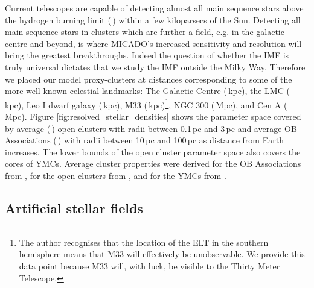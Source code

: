 Current telescopes are capable of detecting almost all main sequence stars above the hydrogen burning limit (\,\msune) within a few kiloparsecs of the Sun. Detecting all main sequence stars in clusters which are further a field, e.g. in the galactic centre and beyond, is where MICADO's increased sensitivity and resolution will bring the greatest breakthroughs. Indeed the question of whether the IMF is truly universal dictates that we study the IMF outside the Milky Way. Therefore we placed our model proxy-clusters at distances corresponding to some of the more well known celestial landmarks: The Galactic Centre (\,kpc), the LMC (\,kpc), Leo I dwarf galaxy (\,kpc), M33 (\,kpc)\footnote{The author recognises that the location of the ELT in the southern hemisphere means that M33 will effectively be unobservable. We provide this data point because M33 will, with luck, be visible to the Thirty Meter Telescope.}, NGC 300 (\,Mpc), and Cen A (\,Mpc). Figure \ref{fig:resolved_stellar_densities} shows the parameter space covered by average (\,\msun) open clusters with radii between 0.1\,pc and 3\,pc and average OB Associations (\,\msun) with radii between 10\,pc and 100\,pc as distance from Earth increases. The lower bounds of the open cluster parameter space also covers the cores of YMCs. Average cluster properties were derived for the OB Associations from \citet{melnik1995}, for the open clusters from \citet{piskunov2007}, and for the YMCs from \citet{portegies2010}. 



\subsection{Artificial stellar fields}

